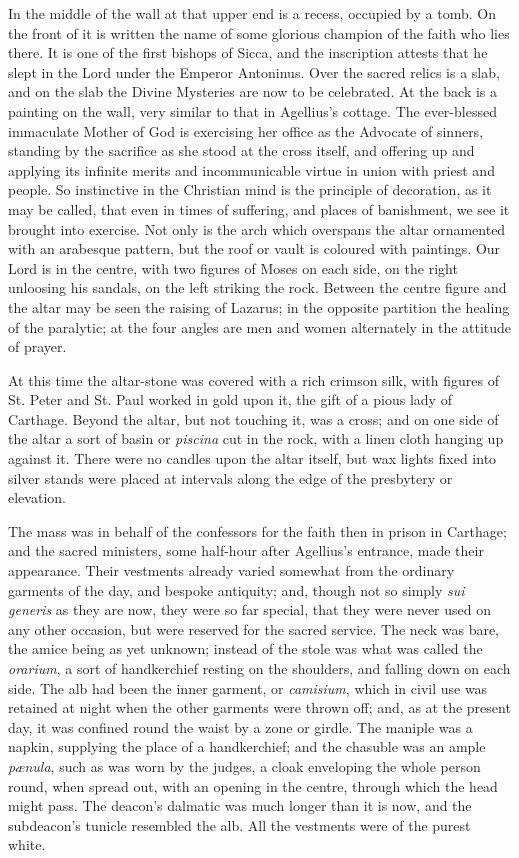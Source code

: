 In the middle of the wall at that upper end is a recess, occupied
by a tomb. On the front of it is written the name of some glorious
champion of the faith who lies there. It is one of the first bishops
of Sicca, and the inscription attests that he slept in the Lord under
the Emperor Antoninus. Over the sacred relics is a slab, and on the
slab the Divine Mysteries are now to be celebrated. At the back
is a painting on the wall, very similar to that in Agellius's cottage.
The ever-blessed immaculate Mother of God is exercising her office as
the Advocate of sinners, standing by the sacrifice as she stood at the
cross itself, and offering up and applying its infinite merits and
incommunicable virtue in union with priest and people. So instinctive
in the Christian mind is the principle of decoration, as it may be
called, that even in times of suffering, and places of banishment, we
see it brought into exercise. Not only is the arch which overspans the
altar ornamented with an arabesque pattern, but the roof or vault is
coloured with paintings. Our Lord is in the centre, with two figures
of Moses on each side, on the right unloosing his sandals, on the left
striking the rock. Between the centre figure and the altar may be seen
the raising of Lazarus; in the opposite partition the healing of the
paralytic; at the four angles are men and women alternately in the
attitude of prayer.

At this time the altar-stone was covered with a rich crimson silk,
with figures of St. Peter and St. Paul worked in gold upon it, the
gift of a pious lady of Carthage. Beyond the altar, but not touching
it, was a cross; and on one side of the altar a sort of basin or \emph{piscina}
cut in the rock, with a linen cloth hanging up against it. There were
no candles upon the altar itself, but wax lights fixed into silver
stands were placed at intervals along the edge of the presbytery or
elevation.

The mass was in behalf of the confessors for the faith then
in prison in Carthage; and the sacred ministers, some half-hour after
Agellius's entrance, made their appearance. Their vestments already
varied somewhat from the ordinary garments of the day, and bespoke
antiquity; and, though not so simply \emph{sui generis} as they are
now, they were so far special, that they were never used on any other
occasion, but were reserved for the sacred service. The neck was bare,
the amice being as yet unknown; instead of the stole was what was
called the \emph{orarium}, a sort of handkerchief resting on the
shoulders, and falling down on each side. The alb had been the inner
garment, or \emph{camisium}, which in civil use was retained at night
when the other garments were thrown off; and, as at the present day,
it was confined round the waist by a zone or girdle. The maniple was a
napkin, supplying the place of a handkerchief; and the chasuble was an
ample \emph{pænula}, such as was worn by the judges, a cloak
enveloping the whole person round, when spread out, with an opening in
the centre, through which the head might pass. The deacon's dalmatic
was much longer than it is now, and the subdeacon's tunicle resembled
the alb. All the vestments were of the purest white.

